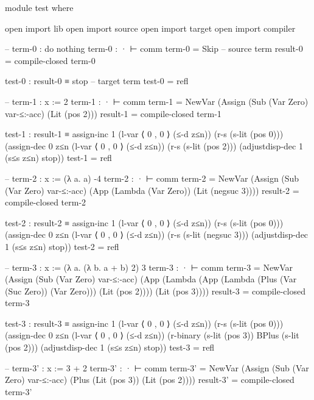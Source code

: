 \documentclass{article}
\begin{document}
\begin{prev}
\begin{code}
module test where

open import lib
open import source
open import target
open import compiler

-- term-0 : do nothing
term-0 : · ⊢ comm
term-0 = Skip -- source term
result-0 = compile-closed term-0

test-0 : result-0 ≡ stop -- target term
test-0 = refl


-- term-1 : x := 2
term-1 : · ⊢ comm
term-1 = 
    NewVar 
        (Assign
            (Sub (Var Zero) var-≤:-acc) 
            (Lit (pos 2)))
result-1 = compile-closed term-1

test-1 : result-1 ≡ 
    assign-inc 1 
    (l-var ⟨ 0 , 0 ⟩ (≤-d z≤n)) 
    (r-s (s-lit (pos 0))) 
    (assign-dec 
        0 z≤n 
        (l-var ⟨ 0 , 0 ⟩ (≤-d z≤n)) 
        (r-s (s-lit (pos 2))) 
        (adjustdisp-dec 1 (s≤s z≤n) stop))
test-1 = refl


-- term-2 : x := (λ a. a) -4
term-2 : · ⊢ comm
term-2 = 
    NewVar 
        (Assign 
            (Sub (Var Zero) var-≤:-acc) 
            (App 
                (Lambda (Var Zero)) 
                (Lit (negsuc 3))))
result-2 = compile-closed term-2

test-2 : result-2 ≡
    assign-inc 1 
    (l-var ⟨ 0 , 0 ⟩ (≤-d z≤n)) 
    (r-s (s-lit (pos 0)))
    (assign-dec 0 z≤n 
        (l-var ⟨ 0 , 0 ⟩ (≤-d z≤n))
        (r-s (s-lit (negsuc 3))) 
        (adjustdisp-dec 1 (s≤s z≤n) stop))
test-2 = refl


-- term-3 : x := (λ a. (λ b. a + b) 2) 3
term-3 : · ⊢ comm
term-3 = 
    NewVar 
        (Assign 
            (Sub (Var Zero) var-≤:-acc) 
            (App 
                (Lambda 
                    (App 
                        (Lambda 
                            (Plus 
                                (Var (Suc Zero))
                                (Var Zero)))
                        (Lit (pos 2))))
                (Lit (pos 3))))
result-3 = compile-closed term-3

test-3 : result-3 ≡
    assign-inc 1 
    (l-var ⟨ 0 , 0 ⟩ (≤-d z≤n)) 
    (r-s (s-lit (pos 0)))
    (assign-dec 0 z≤n 
        (l-var ⟨ 0 , 0 ⟩ (≤-d z≤n))
        (r-binary 
            (s-lit (pos 3)) 
            BPlus 
            (s-lit (pos 2)))
        (adjustdisp-dec 1 (s≤s z≤n) stop))
test-3 = refl

-- term-3' : x := 3 + 2
term-3' : · ⊢ comm
term-3' = 
    NewVar 
        (Assign 
            (Sub (Var Zero) var-≤:-acc) 
            (Plus 
                (Lit (pos 3)) 
                (Lit (pos 2))))
result-3' = compile-closed term-3'


\end{code}
\end{prev}
\end{document}
